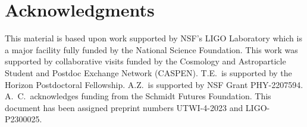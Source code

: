 \documentclass[twocolumn]{aastex631}
\begin{document}
\section{Acknowledgments}
This material is based upon work supported by NSF's LIGO Laboratory which is a major facility fully funded by the National Science Foundation.
This work was supported by collaborative visits funded by the Cosmology and Astroparticle Student and Postdoc Exchange Network (CASPEN). 
T.E.\ is supported by the Horizon Postdoctoral Fellowship.
A.Z.~is supported by NSF Grant PHY-2207594.
A.~C.\ acknowledges funding from the Schmidt Futures Foundation.
This document has been assigned preprint numbers UTWI-4-2023 and LIGO-P2300025.


\end{document}
